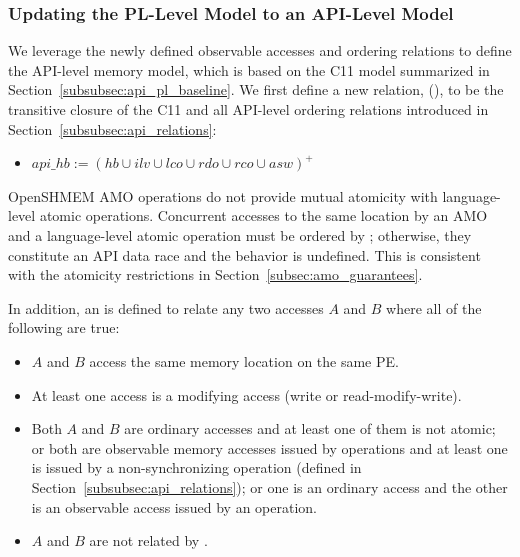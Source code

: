 \subsubsection{Updating the PL-Level Model to an API-Level Model}\label{subsubsec:api_integrate}

We leverage the newly defined observable accesses and ordering relations to define the
    API-level memory model, which is based on the C11 model summarized in
    Section~\ref{subsubsec:api_pl_baseline}.
We first define a new relation, \relAHB{} (), to be the transitive closure
    of the C11 \relHB{} and all API-level ordering relations introduced in
    Section~\ref{subsubsec:api_relations}:

\begin{itemize}
    \item $api\_hb := (hb \cup ilv \cup lco \cup rdo \cup rco \cup asw)^+$
\end{itemize}

OpenSHMEM \ac{AMO} operations do not provide mutual atomicity with language-level atomic
    operations. Concurrent accesses to the same location by an \openshmem \ac{AMO} and a
    language-level atomic operation must be ordered by \relAHB{}; otherwise, they
    constitute an API data race and the behavior is undefined. This is consistent with
    the atomicity restrictions in Section~\ref{subsec:amo_guarantees}.

In addition, an \relADR{} is defined to relate any two accesses $A$ and $B$ where all of
    the following are true:
\begin{itemize}
    \item $A$ and $B$ access the same memory location on the same \ac{PE}.
    \item At least one access is a modifying access (write or read-modify-write).
    \item Both $A$ and $B$ are ordinary accesses and at least one of them is not atomic;
        or both are observable memory accesses issued by \openshmem operations and at
        least one is issued by a non-synchronizing \openshmem operation (defined in
        Section~\ref{subsubsec:api_relations}); or one is an ordinary access and the
        other is an observable access issued by an \openshmem operation.
    \item $A$ and $B$ are not related by \relAHB{}.
\end{itemize}

